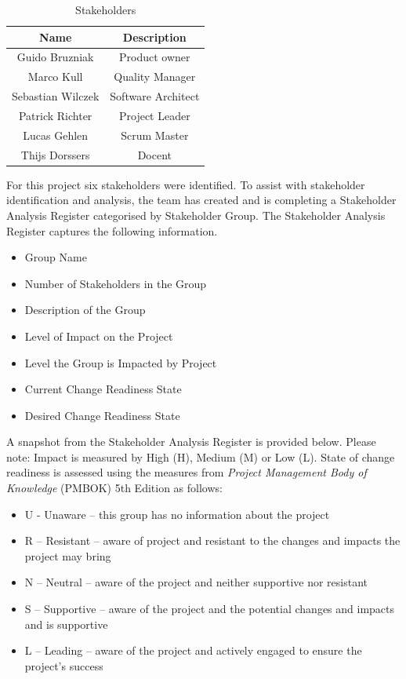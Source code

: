 \begin{table}[H]
    \centering
    \begin{tabular}{|c|c|}
        \hline
        \cellcolor{gray}Name & \cellcolor{gray}Description \\ \hline
        Guido Bruzniak & Product owner \\ \hline
        Marco Kull & Quality Manager \\ \hline
        Sebastian Wilczek & Software Architect \\ \hline
        Patrick Richter & Project Leader \\ \hline
        Lucas Gehlen & Scrum Master \\ \hline
        Thijs Dorssers & Docent \\ \hline
    \end{tabular}
    \caption{Stakeholders}
    \label{tab:stakeholders}
\end{table}

For this project six stakeholders were identified. To assist with stakeholder identification and analysis, the team has created and is completing a Stakeholder Analysis Register categorised by Stakeholder Group. The Stakeholder Analysis Register captures the following information.

\begin{itemize}
    \item Group Name
    \item Number of Stakeholders in the Group
    \item Description of the Group
    \item Level of Impact on the Project
    \item Level the Group is Impacted by Project
    \item Current Change Readiness State
    \item Desired Change Readiness State
\end{itemize}

A snapshot from the Stakeholder Analysis Register is provided below.
Please note: Impact is measured by High (H), Medium (M) or Low (L).  State of change readiness is assessed using the measures from \textit{Project Management Body of Knowledge} (PMBOK) 5th Edition  as follows: 

\begin{itemize}
    \item U - Unaware – this group has no information about the project
    \item R – Resistant – aware of project and resistant to the changes and impacts the project may bring
    \item N – Neutral – aware of the project and neither supportive nor resistant
    \item S – Supportive – aware of the project and the potential changes and impacts and is supportive 
    \item L – Leading – aware of the project and actively engaged to ensure the project’s success
\end{itemize}

